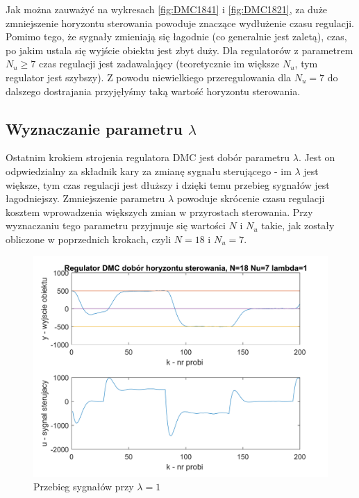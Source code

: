 \documentclass[a4paper, 10pt]{article}
\begin{document}
Jak można zauważyć na wykresach \ref{fig:DMC1841} i \ref{fig:DMC1821}, za duże zmniejszenie horyzontu sterowania powoduje znaczące wydłużenie czasu regulacji. Pomimo tego, że sygnały zmieniają się łagodnie (co generalnie jest zaletą), czas, po jakim ustala się wyjście obiektu jest zbyt duży. Dla regulatorów z parametrem $N_{u}\geq7$ czas regulacji jest zadawalający (teoretycznie im większe $N_{u}$, tym regulator jest szybszy). Z powodu niewielkiego przeregulowania dla $N_{u}=7$ do dalszego dostrajania przyjęłyśmy taką wartość horyzontu sterowania.

\subsection{Wyznaczanie parametru $\lambda$}
Ostatnim krokiem strojenia regulatora DMC jest dobór parametru $\lambda$. Jest on odpwiedzialny za składnik kary za zmianę sygnału sterującego - im $\lambda$ jest większe, tym czas regulacji jest dłuższy i dzięki temu przebieg sygnałów jest łagodniejszy. Zmniejszenie parametru $\lambda$ powoduje skrócenie czasu regulacji kosztem wprowadzenia większych zmian w przyrostach sterowania. Przy wyznaczaniu tego parametru przyjmuje się wartości $N$ i $N_{u}$ takie, jak zostały obliczone w poprzednich krokach, czyli $N=18$ i $N_{u}=7$.
\begin{figure}[H]
	\centering
	\includegraphics[width=0.9\linewidth]{DMC1871}
	\caption{Przebieg sygnałów przy $\lambda=1$}
	\label{fig:DMC1871}
\end{figure}
\end{document}
